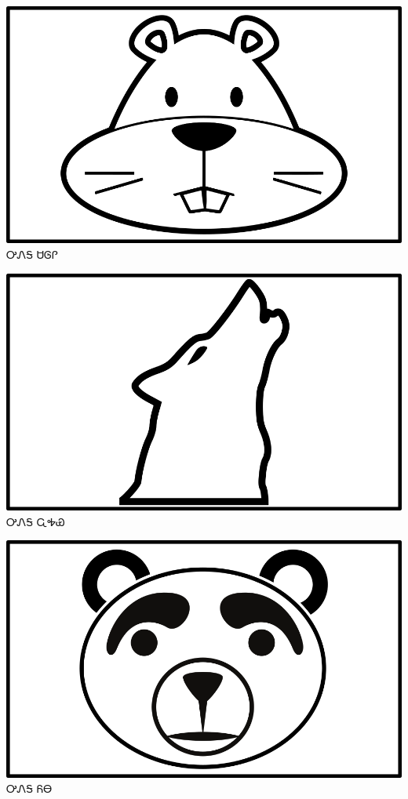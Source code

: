 \documentclass[avery5371]{flashcards}%
\begin{document}
    \begin{flashcard}{
        \includegraphics[width=0.95\columnwidth,height=.51\columnwidth,keepaspectratio]{../artwork/objects-animate/saloli}
    }
        \Huge ᎤᏁᎦ ᏌᎶᎵ
    \end{flashcard}

    \begin{flashcard}{
        \includegraphics[width=0.95\columnwidth,height=.51\columnwidth,keepaspectratio]{../artwork/objects-animate/wahya}
    }
        \Huge ᎤᏁᎦ ᏩᎭᏯ
    \end{flashcard}

    \begin{flashcard}{
        \includegraphics[width=0.95\columnwidth,height=.51\columnwidth,keepaspectratio]{../artwork/objects-animate/yona}
    }
        \Huge ᎤᏁᎦ ᏲᎾ
    \end{flashcard}
\end{document}
